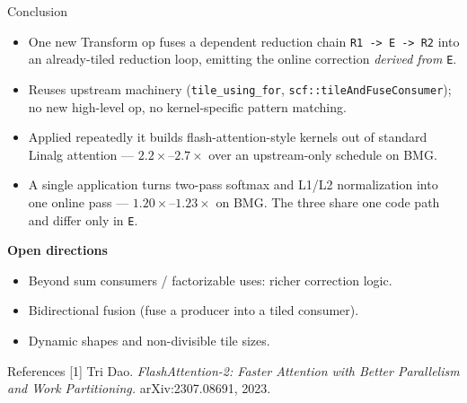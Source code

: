 \documentclass[10pt, aspectratio=169]{beamer}
\newcommand{\code}[1]{\texttt{\small #1}}
\begin{document}
\begin{frame}{Conclusion}
  \begin{itemize}
    \item One new Transform op fuses a dependent reduction chain
      \code{R1 -> E -> R2} into an already-tiled reduction loop, emitting the
      online correction \emph{derived from} \code{E}.
    \item Reuses upstream machinery (\code{tile\_using\_for},
      \code{scf::tileAndFuseConsumer}); no new high-level op, no kernel-specific
      pattern matching.
    \item Applied repeatedly it builds flash-attention-style kernels out of
      standard Linalg attention --- $2.2\times$--$2.7\times$ over an
      upstream-only schedule on BMG.
    \item A single application turns two-pass softmax and L1/L2 normalization
      into one online pass --- $1.20\times$--$1.23\times$ on BMG. The three share
      one code path and differ only in \code{E}.
  \end{itemize}
  \vspace{2mm}
  \textbf{Open directions}
  \begin{itemize}
    \item Beyond sum consumers / factorizable uses: richer correction logic.
    \item Bidirectional fusion (fuse a producer into a tiled consumer).
    \item Dynamic shapes and non-divisible tile sizes.
  \end{itemize}
\end{frame}

\begin{frame}{References}
  \small
  [1] Tri Dao. \emph{FlashAttention-2: Faster Attention with Better Parallelism
  and Work Partitioning.} arXiv:2307.08691, 2023.
\end{frame}
\end{document}
